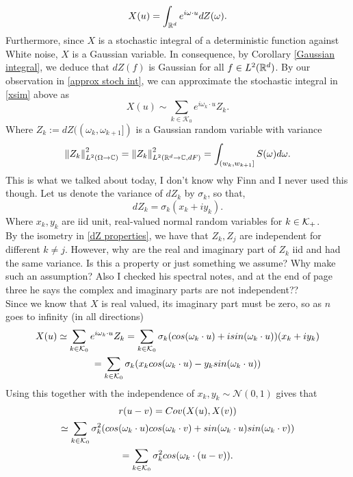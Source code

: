 \documentclass[12pt]{article}
\newcommand{\red}[1]{{\color{red}#1}}
\begin{document}
\begin{equation}\label{xsim}
	X(u)=\int_{{\mathbb R}^d}e^{i\omega\cdot u} dZ(\omega).
\end{equation}
Furthermore, since $X$ is a stochastic integral of a deterministic function against White noise,  $X$ is a Gaussian variable. In consequence, by Corollary \eqref{Gaussian integral}, we deduce that $dZ(f)$ is Gaussian for all  $f\in L^2({\mathbb R}^d)$. By our observation in \eqref{approx stoch int}, we can approximate the stochastic integral in \eqref{xsim} above as
\begin{equation*}
	X(u)\sim \sum_{k\in \mathcal{K}_0} e^{i\omega_k\cdot u}Z_k.
\end{equation*}
Where $Z_k:=dZ((\omega_k,\omega_{k+1}])$ is a Gaussian random variable with variance
\begin{equation*}
	\norm{Z_k}^2_{L^2(\Omega\to\mathbb{C})}=\norm{Z_k}^2_{L^2({\mathbb R}^d\to\mathbb{C},dF)}=\int_{(w_k,w_{k+1}]}S(\omega)d\omega.
\end{equation*}
\red{This is what we talked about today, I don't know why Finn and I never used this though.}
Let us denote the variance of $dZ_k$ by  $\sigma _k$, so that,
\begin{equation*}
	dZ_k=\sigma _k(x_k+iy_k).
\end{equation*}
Where $x_k,y_k$ are iid unit, real-valued normal random variables for $k \in \mathcal{K}_+$.
\\
\red{By the isometry in \eqref{dZ properties}, we have that $Z_k,Z_j$ are independent for different  $k\neq j$. However, why are the real and imaginary part of $Z_k$  iid and had the same variance. Is this  a property or just something we assume? Why make such an assumption? Also I checked his spectral notes, and at the end of page three he says the complex and imaginary parts are not independent??}\\
Since we know that $X$ is real valued, its imaginary part must be zero, so as $n$ goes to infinity (in all directions)
\begin{multline}\label{sr+}
	X(u)\simeq\sum_{k\in \mathcal{K}_0} e^{i\omega_k\cdot u}Z_k=\sum_{k\in \mathcal{K}_0}\sigma _k(cos(\omega_k\cdot u) + i sin(\omega_k\cdot u))(x_k +iy_k)\\
	=\sum_{k\in \mathcal{K}_0}\sigma _k(x_{k}cos(\omega_k\cdot u)-y_{k}sin(\omega_k\cdot u))
\end{multline}
Using this together with the independence of $x_k,y_k\sim\mathcal{N}(0,1)$ gives that
\begin{multline}\label{eq1}
	r(u-v)=Cov(X(u),X(v))\\\simeq \sum_{k\in \mathcal{K}_0} \sigma_k^2(cos(\omega_k\cdot u)cos(\omega_k\cdot v)+sin(\omega_k\cdot u)sin(\omega_k\cdot v))\\
	=\sum_{k\in \mathcal{K}_0} \sigma _k^2 cos(\omega_k\cdot(u-v)).
\end{multline}
\end{document}
